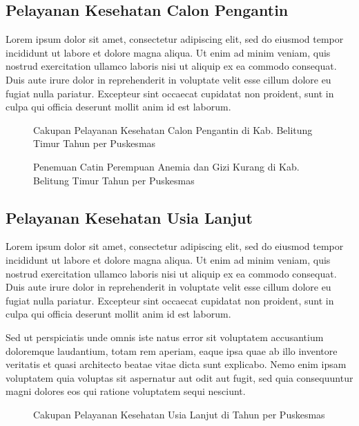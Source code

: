 \subsection{Pelayanan Kesehatan Calon Pengantin}
Lorem ipsum dolor sit amet, consectetur adipiscing elit, sed do eiusmod tempor incididunt ut labore et dolore magna aliqua. Ut enim ad minim veniam, quis nostrud exercitation ullamco laboris nisi ut aliquip ex ea commodo consequat. Duis aute irure dolor in reprehenderit in voluptate velit esse cillum dolore eu fugiat nulla pariatur. Excepteur sint occaecat cupidatat non proident, sunt in culpa qui officia deserunt mollit anim id est laborum.

\begin{figure}[H]
	\centering
	\caption{Cakupan Pelayanan Kesehatan Calon Pengantin di Kab. Belitung Timur Tahun \tP per Puskesmas}
	\label{fig:Cakupan-Yankes-Catin}
\end{figure}

\begin{figure}[H]
	\centering
	\caption{Penemuan Catin Perempuan Anemia dan Gizi Kurang di Kab. Belitung Timur Tahun \tP per Puskesmas}
	\label{fig:Cakupan-Yankes-Catin-Anemia}
\end{figure}


\subsection{Pelayanan Kesehatan Usia Lanjut}
Lorem ipsum dolor sit amet, consectetur adipiscing elit, sed do eiusmod tempor incididunt ut labore et dolore magna aliqua. Ut enim ad minim veniam, quis nostrud exercitation ullamco laboris nisi ut aliquip ex ea commodo consequat. Duis aute irure dolor in reprehenderit in voluptate velit esse cillum dolore eu fugiat nulla pariatur. Excepteur sint occaecat cupidatat non proident, sunt in culpa qui officia deserunt mollit anim id est laborum.

Sed ut perspiciatis unde omnis iste natus error sit voluptatem accusantium doloremque laudantium, totam rem aperiam, eaque ipsa quae ab illo inventore veritatis et quasi architecto beatae vitae dicta sunt explicabo. Nemo enim ipsam voluptatem quia voluptas sit aspernatur aut odit aut fugit, sed quia consequuntur magni dolores eos qui ratione voluptatem sequi nesciunt.

\begin{figure}[H]
    \centering
    \caption{Cakupan Pelayanan Kesehatan Usia Lanjut di \namaKabupaten Tahun \tP per Puskesmas}
    \label{fig:Cakupan-Yankes-Usila}
\end{figure}

